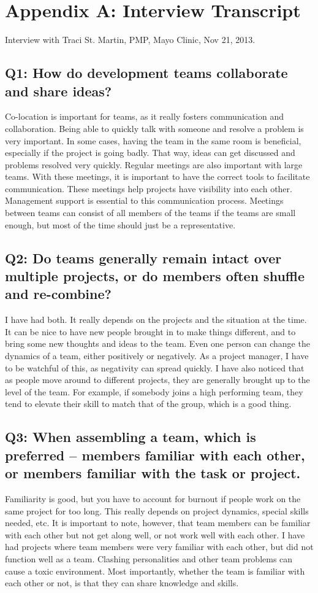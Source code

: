 \clearpage

\section*{Appendix A: Interview Transcript}
Interview with Traci St. Martin, PMP\textregistered, Mayo Clinic, Nov 21, 2013.

\subsection*{Q1: How do development teams collaborate and share ideas?}
Co-location is important for teams, as it really fosters communication and collaboration. Being able to quickly talk with someone and resolve a problem is very important. In some cases, having the team in the same room is beneficial, especially if the project is going badly. That way, ideas can get discussed and problems resolved very quickly. Regular meetings are also important with large teams. With these meetings, it is important to have the correct tools to facilitate communication. These meetings help projects have visibility into each other. Management support is essential to this communication process. Meetings between teams can consist of all members of the teams if the teams are small enough, but most of the time should just be a representative.

\subsection*{Q2: Do teams generally remain intact over multiple projects, or do members often shuffle and re-combine?}
I have had both. It really depends on the projects and the situation at the time. It can be nice to have new people brought in to make things different, and to bring some new thoughts and ideas to the team. Even one person can change the dynamics of a team, either positively or negatively. As a project manager, I have to be watchful of this, as negativity can spread quickly. I have also noticed that as people move around to different projects, they are generally brought up to the level of the team. For example, if somebody joins a high performing team, they tend to elevate their skill to match that of the group, which is a good thing.

\subsection*{Q3: When assembling a team, which is preferred -- members familiar with each other, or members familiar with the task or project.}
Familiarity is good, but you have to account for burnout if people work on the same project for too long. This really depends on project dynamics, special skills needed, etc. It is important to note, however, that team members can be familiar with each other but not get along well, or not work well with each other. I have had projects where team members were very familiar with each other, but did not function well as a team. Clashing personalities and other team problems can cause a toxic environment. Most importantly, whether the team is familiar with each other or not, is that they can share knowledge and skills.

